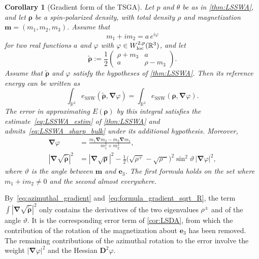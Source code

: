 \documentclass[final,reqno]{amsart}
\newtheorem{corollary}[theorem]{Corollary}
\theoremstyle{remark}
\newcommand{\wt}[1]{\widetilde{#1}}
\newcommand{\RR}{\mathbb{R}}
\newcommand{\SSW}{\mathrm{SSW}}
\newcommand{\grad}{\bm{\nabla}}
\begin{document}
\begin{corollary}[Gradient form of the TSGA]\label{cor:gradient}
Let $p$ and $\theta$ be as in \cref{thm:LSSWA}, and let $\bm{\rho}$ be a spin-polarized density, with total density $\rho$ and magnetization $\mathbf{m}=(m_1,m_2,m_3)$. Assume that
\begin{equation}\label{eq:canonical_phase}
m_1+im_2=a\,e^{i\varphi}
\end{equation}
for two real functions $a$ and $\varphi$ with $\varphi\in W^{2,p}_{\rm loc}(\RR^3)$, and let
\begin{equation*}
\wt{\bm{\rho}}:=\frac12\begin{pmatrix}\rho+m_3&a\\ a&\rho-m_3\end{pmatrix}.
\end{equation*}
Assume that $\wt{\bm{\rho}}$ and $\varphi$ satisfy the hypotheses of \cref{thm:LSSWA}. Then its reference energy can be written as
\begin{equation}\label{eq:gradient_approx}
\int_{\RR^3}e_\SSW(\wt{\bm{\rho}},\grad\varphi)
=\int_{\RR^3}e_\SSW(\bm{\rho},\grad\varphi).
\end{equation}
The error in approximating $E(\bm{\rho})$ by this integral satisfies the estimate~\cref{eq:LSSWA_estim} of \cref{thm:LSSWA} and admits~\cref{eq:LSSWA_sharp_bulk} under its additional hypothesis. Moreover,
\begin{equation}\label{eq:azimuthal_gradient}
\begin{aligned}
\grad\varphi&=\frac{m_1\grad m_2-m_2\grad m_1}{m_1^2+m_2^2},\\
|\grad\sqrt{\wt{\bm{\rho}}}|^2&=|\grad\sqrt{\bm{\rho}}|^2-\frac12\Big(\sqrt{\rho^+}-\sqrt{\rho^-}\Big)^2\sin^2\vartheta\,|\grad\varphi|^2,
\end{aligned}
\end{equation}
where $\vartheta$ is the angle between $\mathbf{m}$ and $\mathbf{e}_3$. The first formula holds on the set where $m_1+im_2\neq0$ and the second almost everywhere.
\end{corollary}

By~\cref{eq:azimuthal_gradient} and~\cref{eq:formula_gradient_sqrt_R}, the term $\int|\grad\sqrt{\wt{\bm{\rho}}}|^2$ only contains the derivatives of the two eigenvalues $\rho^\pm$ and of the angle $\vartheta$. It is the corresponding error term of \cref{cor:LSDA}, from which the contribution of the rotation of the magnetization about $\mathbf{e}_3$ has been removed. The remaining contributions of the azimuthal rotation to the error involve the weight $|\grad\varphi|^2$ and the Hessian $\mathbf{D}^2\varphi$.
\end{document}
